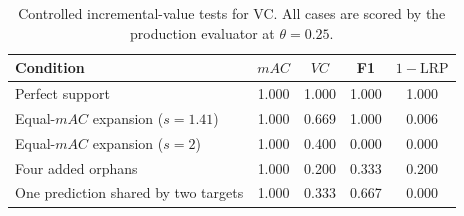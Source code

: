 \begin{table}[t]
\centering
\caption{Controlled incremental-value tests for VC. All cases are scored by the production evaluator at $\theta=0.25$.}
\label{tab:vc_incremental_value}
\begin{tabular}{lcccc}
\hline
Condition & $mAC$ & $VC$ & F1 & $1-\mathrm{LRP}$ \\
\hline
Perfect support & 1.000 & 1.000 & 1.000 & 1.000 \\
Equal-$mAC$ expansion ($s=1.41$) & 1.000 & 0.669 & 1.000 & 0.006 \\
Equal-$mAC$ expansion ($s=2$) & 1.000 & 0.400 & 0.000 & 0.000 \\
Four added orphans & 1.000 & 0.200 & 0.333 & 0.200 \\
One prediction shared by two targets & 1.000 & 0.333 & 0.667 & 0.000 \\
\hline
\end{tabular}
\end{table}

